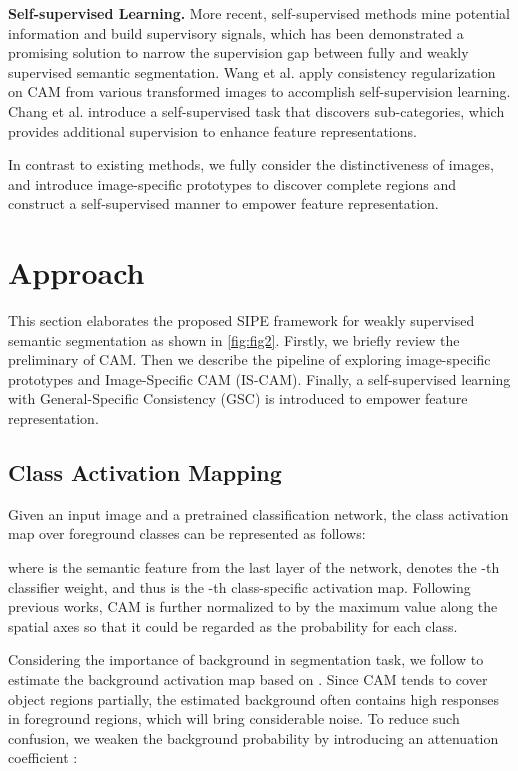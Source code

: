 \documentclass[10pt,twocolumn,letterpaper]{article}
\begin{document}
\noindent\textbf{Self-supervised Learning.} More recent, self-supervised methods mine potential information and build supervisory signals, which has been demonstrated a promising solution to narrow the supervision gap between fully and weakly supervised semantic segmentation.
Wang et al. \cite{wang2020self} apply consistency regularization on CAM from various transformed images to accomplish self-supervision learning.
Chang et al. \cite{chang2020weakly} introduce a self-supervised task that discovers sub-categories, which provides additional supervision to enhance feature representations.

In contrast to existing methods, we fully consider the distinctiveness of images, and introduce image-specific prototypes to discover complete regions and construct a self-supervised manner to empower feature representation.

\section{Approach}
This section elaborates the proposed SIPE framework for weakly supervised semantic segmentation as shown in \cref{fig:fig2}.
Firstly, we briefly review the preliminary of CAM.
Then we describe the pipeline of exploring image-specific prototypes and Image-Specific CAM (IS-CAM).
Finally, a self-supervised learning with General-Specific Consistency (GSC) is introduced to empower feature representation.

\subsection{Class Activation Mapping}
Given an input image and a pretrained classification network, the class activation map  over  foreground classes can be represented as follows:

where  is the semantic feature from the last layer of the network,  denotes the -th classifier weight, and thus  is the -th class-specific activation map.
Following previous works, CAM is further normalized to  by the maximum value along the spatial axes so that it could be regarded as the probability for each class.

Considering the importance of background in segmentation task, we follow \cite{wang2020self} to estimate the background activation map  based on .
Since CAM tends to cover object regions partially, the estimated background often contains high responses in foreground regions, which will bring considerable noise.
To reduce such confusion, we weaken the background probability by introducing an attenuation coefficient :
\end{document}
